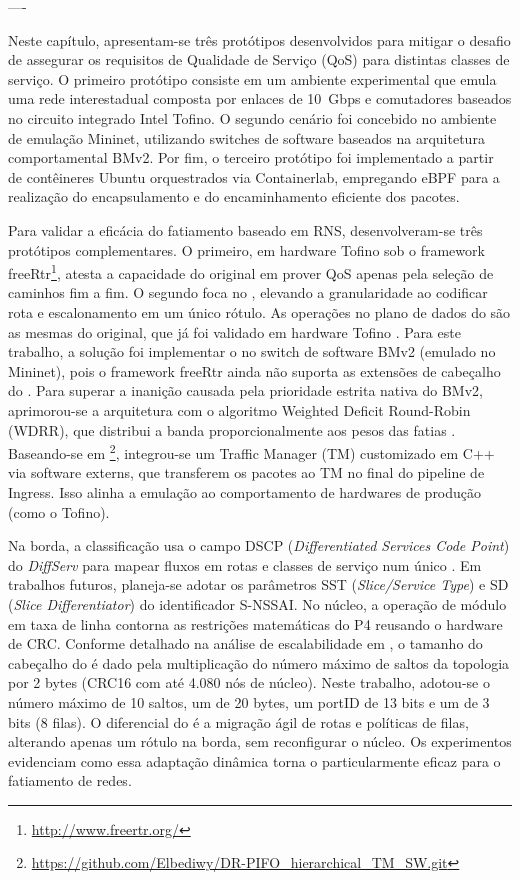 ----

Neste capítulo, apresentam-se três protótipos desenvolvidos para mitigar o 
desafio de assegurar os requisitos de Qualidade de Serviço (QoS) para distintas 
classes de serviço. O primeiro protótipo consiste em um ambiente experimental que 
emula uma rede interestadual composta por enlaces de 10~Gbps e comutadores 
baseados no circuito integrado Intel Tofino\textregistered. O segundo cenário 
foi concebido no ambiente de emulação Mininet, utilizando switches de software 
baseados na arquitetura comportamental BMv2. Por fim, o terceiro protótipo 
foi implementado a partir de contêineres Ubuntu orquestrados via Containerlab, 
empregando eBPF para a realização do encapsulamento e do encaminhamento 
eficiente dos pacotes.

Para validar a eficácia do fatiamento baseado em RNS, desenvolveram-se três protótipos complementares. O primeiro, em hardware Tofino sob o framework freeRtr\footnote{\url{http://www.freertr.org/}}, atesta a capacidade do \polka original em prover QoS apenas pela seleção de caminhos fim a fim. O segundo foca no \spolka, elevando a granularidade ao codificar rota e escalonamento em um único rótulo. As operações no plano de dados do \spolka são as mesmas do \polka original, que já foi validado em hardware Tofino \cite{dominicini2021}. Para este trabalho, a solução foi implementar o \spolka no switch de software BMv2 (emulado no Mininet), pois o framework freeRtr ainda não suporta as extensões de cabeçalho do \spolka. Para superar a inanição causada pela prioridade estrita nativa do BMv2, aprimorou-se a arquitetura com o algoritmo Weighted Deficit Round-Robin (WDRR), que distribui a banda proporcionalmente aos pesos das fatias \cite{Elbediwy2025}. Baseando-se em \textcite{Elbediwy2025}\footnote{\url{https://github.com/Elbediwy/DR-PIFO_hierarchical_TM_SW.git}}, integrou-se um Traffic Manager (TM) customizado em C++ via software externs, que transferem os pacotes ao TM no final do pipeline de Ingress. Isso alinha a emulação ao comportamento de hardwares de produção (como o Tofino).

Na borda, a classificação usa o campo DSCP (\textit{Differentiated Services Code Point}) do \textit{DiffServ} para mapear fluxos em rotas e classes de serviço num único \routeID. Em trabalhos futuros, planeja-se adotar os parâmetros SST (\textit{Slice/Service Type}) e SD (\textit{Slice Differentiator}) do identificador S-NSSAI. No núcleo, a operação de módulo em taxa de linha contorna as restrições matemáticas do P4 reusando o hardware de CRC. Conforme detalhado na análise de escalabilidade em \cite{dominicini2020}, o tamanho do cabeçalho do \routeID é dado pela multiplicação do número máximo de saltos da topologia por 2 bytes (CRC16 com até 4.080 nós de núcleo). Neste trabalho, adotou-se o número máximo de 10 saltos, um \routeID de 20 bytes, um portID de 13 bits e um \qID de 3 bits (8 filas). O diferencial do \spolka é a migração ágil de rotas e políticas de filas, alterando apenas um rótulo na borda, sem reconfigurar o núcleo. Os experimentos evidenciam como essa adaptação dinâmica torna o \spolka particularmente eficaz para o fatiamento de redes.

